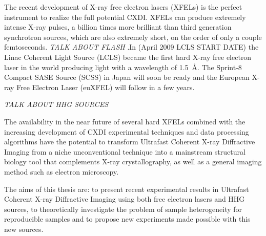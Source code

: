 The recent development of X-ray free electron lasers (XFELs) is the perfect
instrument to realize the full potential CXDI. XFELs can produce extremely
intense X-ray pulses, a billion times more brilliant than third
generation synchrotron sources, which are also extremely short, on the order of
only a couple femtoseconds. {\em TALK ABOUT FLASH} .In (April 2009 LCLS START DATE) the Linac Coherent Light Source (LCLS)
became the first hard X-ray free electron laser in the world producing light
with a wavelength of \mbox{1.5 \AA}. The Sprint-8 Compact SASE Source (SCSS) in
Japan will soon be ready and the European X-ray Free Electron Laser (euXFEL)
will follow in a few years.

{\em TALK ABOUT HHG SOURCES}

The availability in the near future of several hard XFELs combined with the
increasing development of CXDI experimental techniques and data processing
algorithms have the potential to transform Ultrafast Coherent X-ray Diffractive
Imaging from a niche unconventional technique into a mainstream structural
biology tool that complements X-ray crystallography, as well as a general
imaging method such as electron microscopy.


The aims of this thesis are: to present recent experimental results in Ultrafast
Coherent X-ray Diffractive Imaging using both free electron lasers and
HHG sources, to theoretically investigate the problem of sample heterogeneity
for reproducible samples and to propose new experiments made possible with this
new sources.
